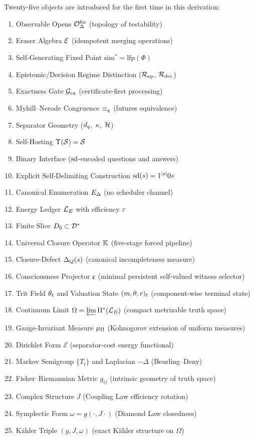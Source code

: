 Twenty-five objects are introduced for the first time in this derivation:
\begin{enumerate}[nosep]
  \item Observable Opens $\mathcal{O}^{\mathrm{fin}}_\Delta$ (topology of testability)
  \item Eraser Algebra $\mathcal{E}$ (idempotent merging operations)
  \item Self-Generating Fixed Point $\mathrm{sim}^* = \mathrm{lfp}(\Phi)$
  \item Epistemic/Decision Regime Distinction ($\mathcal{R}_{\mathrm{ep}}$, $\mathcal{R}_{\mathrm{dec}}$)
  \item Exactness Gate $\mathcal{G}_{\mathrm{ex}}$ (certificate-first processing)
  \item Myhill--Nerode Congruence $\equiv_q$ (futures equivalence)
  \item Separator Geometry ($d_q$, $\kappa$, $\mathcal{H}$)
  \item Self-Hosting $\Upsilon(\mathcal{S}) = \mathcal{S}$
  \item Binary Interface ($\mathrm{sd}$-encoded questions and answers)
  \item Explicit Self-Delimiting Construction $\mathrm{sd}(s) = 1^{|s|}0s$
  \item Canonical Enumeration $E_\Delta$ (no scheduler channel)
  \item Energy Ledger $\mathcal{L}_E$ with efficiency $\varepsilon$
  \item Finite Slice $D_0 \subset \mathcal{D}^*$
  \item Universal Closure Operator $\mathbb{K}$ (five-stage forced pipeline)
  \item Closure-Defect $\Delta_{Q}(s)$ (canonical incompleteness measure)
  \item Consciousness Projector $\mathfrak{c}$ (minimal persistent self-valued witness selector)
  \item Trit Field $\theta_t$ and Valuation State $(m, \theta, r)_t$ (component-wise terminal state)
  \item Continuum Limit $\Omega = \varprojlim \Pi^*(\mathcal{L}_B)$ (compact metrizable truth space)
  \item Gauge-Invariant Measure $\mu_\Pi$ (Kolmogorov extension of uniform measures)
  \item Dirichlet Form $\mathcal{E}$ (separator-cost energy functional)
  \item Markov Semigroup $\{T_t\}$ and Laplacian $-\Delta$ (Beurling--Deny)
  \item Fisher--Riemannian Metric $g_{ij}$ (intrinsic geometry of truth space)
  \item Complex Structure $J$ (Coupling Law efficiency rotation)
  \item Symplectic Form $\omega = g(\cdot, J\cdot)$ (Diamond Law closedness)
  \item K\"{a}hler Triple $(g, J, \omega)$ (exact K\"{a}hler structure on $\Omega$)
\end{enumerate}

